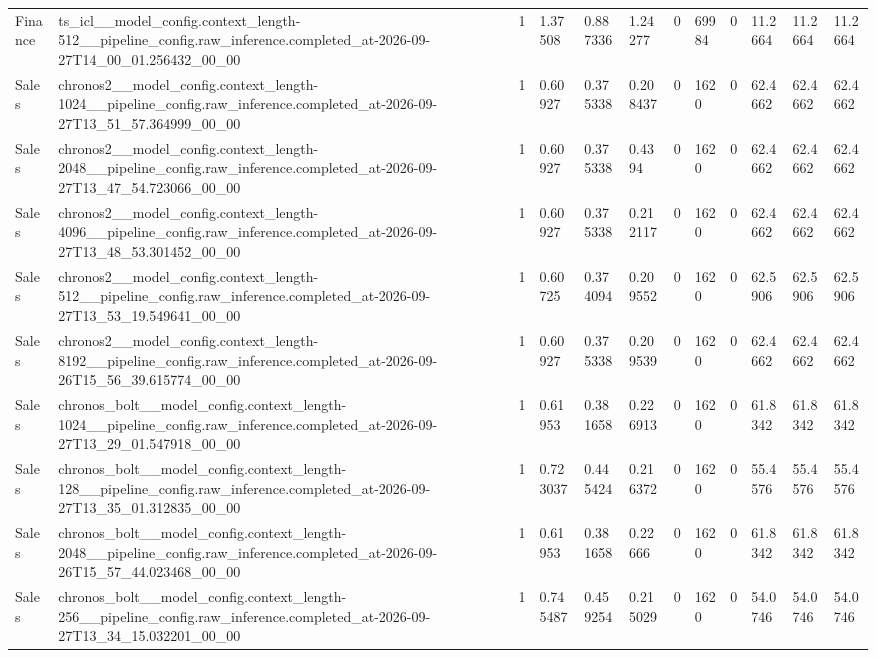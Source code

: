 \begin{tabular}{llllllllllll}
Finance & ts\_icl\_\_model\_config.context\_length-512\_\_pipeline\_config.raw\_inference.completed\_at-2026-09-27T14\_00\_01.256432\_00\_00 & 1 & 1.37508 & 0.887336 & 1.24277 & 0 & 69984 & 0 & 11.2664 & 11.2664 & 11.2664 \\
Sales & chronos2\_\_model\_config.context\_length-1024\_\_pipeline\_config.raw\_inference.completed\_at-2026-09-27T13\_51\_57.364999\_00\_00 & 1 & 0.60927 & 0.375338 & 0.208437 & 0 & 1620 & 0 & 62.4662 & 62.4662 & 62.4662 \\
Sales & chronos2\_\_model\_config.context\_length-2048\_\_pipeline\_config.raw\_inference.completed\_at-2026-09-27T13\_47\_54.723066\_00\_00 & 1 & 0.60927 & 0.375338 & 0.4394 & 0 & 1620 & 0 & 62.4662 & 62.4662 & 62.4662 \\
Sales & chronos2\_\_model\_config.context\_length-4096\_\_pipeline\_config.raw\_inference.completed\_at-2026-09-27T13\_48\_53.301452\_00\_00 & 1 & 0.60927 & 0.375338 & 0.212117 & 0 & 1620 & 0 & 62.4662 & 62.4662 & 62.4662 \\
Sales & chronos2\_\_model\_config.context\_length-512\_\_pipeline\_config.raw\_inference.completed\_at-2026-09-27T13\_53\_19.549641\_00\_00 & 1 & 0.60725 & 0.374094 & 0.209552 & 0 & 1620 & 0 & 62.5906 & 62.5906 & 62.5906 \\
Sales & chronos2\_\_model\_config.context\_length-8192\_\_pipeline\_config.raw\_inference.completed\_at-2026-09-26T15\_56\_39.615774\_00\_00 & 1 & 0.60927 & 0.375338 & 0.209539 & 0 & 1620 & 0 & 62.4662 & 62.4662 & 62.4662 \\
Sales & chronos\_bolt\_\_model\_config.context\_length-1024\_\_pipeline\_config.raw\_inference.completed\_at-2026-09-27T13\_29\_01.547918\_00\_00 & 1 & 0.61953 & 0.381658 & 0.226913 & 0 & 1620 & 0 & 61.8342 & 61.8342 & 61.8342 \\
Sales & chronos\_bolt\_\_model\_config.context\_length-128\_\_pipeline\_config.raw\_inference.completed\_at-2026-09-27T13\_35\_01.312835\_00\_00 & 1 & 0.723037 & 0.445424 & 0.216372 & 0 & 1620 & 0 & 55.4576 & 55.4576 & 55.4576 \\
Sales & chronos\_bolt\_\_model\_config.context\_length-2048\_\_pipeline\_config.raw\_inference.completed\_at-2026-09-26T15\_57\_44.023468\_00\_00 & 1 & 0.61953 & 0.381658 & 0.22666 & 0 & 1620 & 0 & 61.8342 & 61.8342 & 61.8342 \\
Sales & chronos\_bolt\_\_model\_config.context\_length-256\_\_pipeline\_config.raw\_inference.completed\_at-2026-09-27T13\_34\_15.032201\_00\_00 & 1 & 0.745487 & 0.459254 & 0.215029 & 0 & 1620 & 0 & 54.0746 & 54.0746 & 54.0746 \\

\end{tabular}

